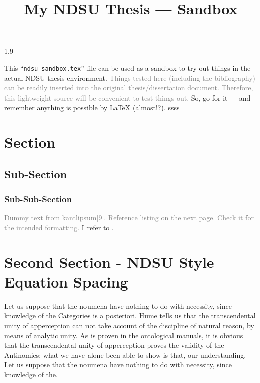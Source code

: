 \documentclass[12pt,mathdesign,showgrid]{ndsu-thesis-2022}
\title{My NDSU Thesis --- Sandbox}
\newcommand\myspacing{1.9} %
\begin{document}
\begin{spacing}{\myspacing}      %


This ``\texttt{ndsu-sandbox.tex}'' file can be used as a sandbox to try out things in the actual NDSU thesis environment. \textcolor{gray}{Things tested here (including the bibliography) can be readily inserted into the original thesis/dissertation document. Therefore, this lightweight source will be convenient to test things out.} So, go for it --- and remember anything is possible by \LaTeX{} (almost!?). ssss

\section{Section}
\subsection{Sub-Section}
\subsubsection{Sub-Sub-Section}

\textcolor{gray}{Dummy text from kantlipsum[9]. Reference listing on the next page. Check it for the intended formatting.} I refer to \citep{lamport94,kopka2004guide,baczkowski1990ndsu,cassuto2010advising,pires2021teens}. \kant[9]



\section{Second Section - NDSU Style Equation Spacing}

Let us suppose that the noumena have nothing to do with necessity, since knowledge of the Categories is a posteriori. Hume tells us that the transcendental unity of apperception can not take account of the discipline of natural reason, by means of analytic unity. As is proven in the ontological manuals, it is obvious that the transcendental unity of apperception proves the validity of the Antinomies; what we have alone been able to show is that, our understanding. Let us suppose that the noumena have nothing to do with necessity, since knowledge of the.


\end{spacing}
\end{document}
